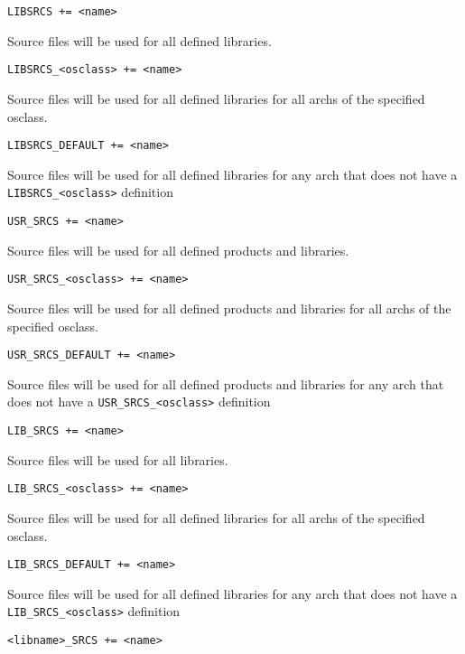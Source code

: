 \begin{description}

\item {}\verb|LIBSRCS += <name>|

Source files will be used for all defined libraries.

\item \verb|LIBSRCS_<osclass> += <name>|

Source files will be used for all defined libraries for all archs of the specified osclass.

\item \verb|LIBSRCS_DEFAULT += <name>|

Source files will be used for all defined libraries for any arch that does not have a \verb|LIBSRCS_<osclass>| 
definition

\item {}\verb|USR_SRCS += <name>|

Source files will be used for all defined products and libraries.

\item

\item \verb|USR_SRCS_<osclass> += <name>|

Source files will be used for all defined products and libraries for all archs of the specified osclass.

\item \verb|USR_SRCS_DEFAULT += <name>|

Source files will be used for all defined products and libraries for any arch that does not have a 
\verb|USR_SRCS_<osclass>| definition

\item {}\verb|LIB_SRCS += <name>|

Source files will be used for all libraries.

\item \verb|LIB_SRCS_<osclass> += <name>|

Source files will be used for all defined libraries for all archs of the specified osclass.

\item \verb|LIB_SRCS_DEFAULT += <name>|

Source files will be used for all defined libraries for any arch that does not have a \verb|LIB_SRCS_<osclass>| 
definition

\item

\item {}\verb|<libname>_SRCS += <name>|


\end{description}
